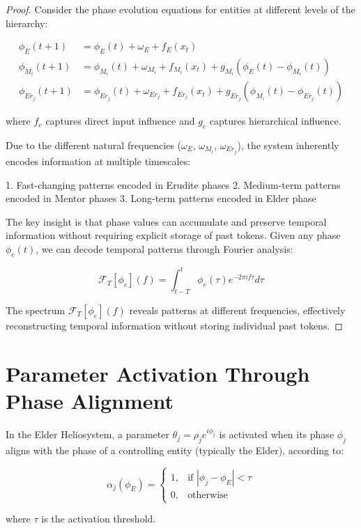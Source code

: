 \begin{proof}
Consider the phase evolution equations for entities at different levels of the hierarchy:

\begin{align}
\phi_E(t+1) &= \phi_E(t) + \omega_E + f_E(x_t) \\
\phi_{M_i}(t+1) &= \phi_{M_i}(t) + \omega_{M_i} + f_{M_i}(x_t) + g_{M_i}(\phi_E(t) - \phi_{M_i}(t)) \\
\phi_{Er_j}(t+1) &= \phi_{Er_j}(t) + \omega_{Er_j} + f_{Er_j}(x_t) + g_{Er_j}(\phi_{M_i}(t) - \phi_{Er_j}(t))
\end{align}

where $f_e$ captures direct input influence and $g_e$ captures hierarchical influence.

Due to the different natural frequencies ($\omega_E$, $\omega_{M_i}$, $\omega_{Er_j}$), the system inherently encodes information at multiple timescales:

1. Fast-changing patterns encoded in Erudite phases
2. Medium-term patterns encoded in Mentor phases
3. Long-term patterns encoded in Elder phase

The key insight is that phase values can accumulate and preserve temporal information without requiring explicit storage of past tokens. Given any phase $\phi_e(t)$, we can decode temporal patterns through Fourier analysis:

\begin{equation}
\mathcal{F}_T[\phi_e](f) = \int_{t-T}^{t} \phi_e(\tau) e^{-2\pi i f \tau} d\tau
\end{equation}

The spectrum $\mathcal{F}_T[\phi_e](f)$ reveals patterns at different frequencies, effectively reconstructing temporal information without storing individual past tokens.
\end{proof}

\section{Parameter Activation Through Phase Alignment}

\begin{definition}
In the Elder Heliosystem, a parameter $\theta_j = \rho_j e^{i\phi_j}$ is activated when its phase $\phi_j$ aligns with the phase of a controlling entity (typically the Elder), according to:

\begin{equation}
\alpha_j(\phi_E) = 
\begin{cases}
1, & \text{if } |\phi_j - \phi_E| < \tau \\
0, & \text{otherwise}
\end{cases}
\end{equation}

where $\tau$ is the activation threshold.
\end{definition}

